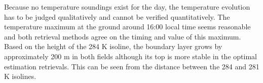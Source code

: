     Because no temperature soundings exist for the day, the temperature
    evolution has to be judged qualitatively and cannot be verified
    quantitatively. The temperature maximum at the ground around 16:00 local
    time seems reasonable and both retrieval methods agree on the timing and
    value of this maximum. Based on the height of the 284 K isoline, the
    boundary layer grows by approximately 200 m in both fields although its top
    is more stable in the optimal estimation retrievals. This can be seen from
    the distance between the 284 and 281 K isolines.

\stopsubsection

\stopsection

